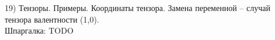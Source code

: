19) Тензоры. Примеры. Координаты тензора. Замена переменной – случай тензора валентности (1,0).\\

Шпаргалка: TODO\\
